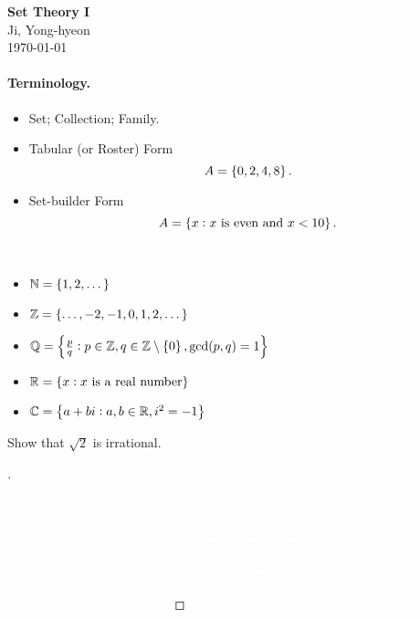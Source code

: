 \documentclass[11pt,openany]{article}
\begin{document}
\begin{center}
	\huge\textbf{Set Theory I}\\
	\vspace{0.5em}
	\large{Ji, Yong-hyeon}\\
	\vspace{0.5em}
	\normalsize{\today}\\
\end{center}

\paragraph*{Terminology.}

\begin{itemize}
	\item Set; Collection; Family.
	\item Tabular (or Roster) Form \[
	A=\set{0,2,4,8}.
	\]
	\item Set-builder Form \[
	A=\set{x:x\ \text{is even and}\ x <10}.
	\]
\end{itemize}

\begin{example*}
	\ \begin{itemize}
		\item $\mathbb{N}=\set{1,2,\dots}$
		\item $\mathbb{Z}=\set{\dots,-2,-1,0,1,2,\dots}$
		\item $\mathbb{Q}=\set{\frac{p}{q}:p\in\mathbb{Z},q\in\mathbb{Z}\setminus\set{0}, \gcd(p,q)=1}$
		\item $\mathbb{R}=\set{x: x\ \text{is a real number}}$
		\item $\mathbb{C}=\set{a+bi:a,b\in\mathbb{R}, i^2=-1}$
	\end{itemize}
\end{example*}
\vfill
\begin{exercise*}
	Show that $\sqrt{2}$ is irrational.
	\begin{proof}[\sol]
		\textcolor{white}{Assume \( \sqrt{2} \in \mathbb{Q} \), i.e., \( \exists p, q \in \mathbb{Z} \) such that
		$\sqrt{2}q = p, \quad g\neq 0$ and $\gcd(p, q) = 1.$
		Then $2q^2 = p^2$. Since \( p^2 \) is even \( \Rightarrow p \) is even,
		\[
		p = 2k \quad \text{for some } k \in \mathbb{Z}
		\]
		By substituting \( p = 2k \) into \( 2q^2 = p^2 \), we have
		\[
		2q^2 = (2k)^2 \implies 2q^2 = 4k^2 \implies q^2 = 2k^2
		\]
		Since \( q^2 \) is even \( \Rightarrow q \) is even,
		\[
		q = 2m \quad \text{for some } m \in \mathbb{Z}
		\]
		Thus, \( p \) and \( q \) are both even \( \implies \gcd(p, q) \geq 2 \), which contradicts the assumption \( \gcd(p, q) = 1 \).}
	\end{proof}
\end{exercise*}
\end{document}
